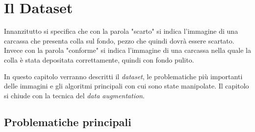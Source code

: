 
\chapter{Il Dataset}

Innanzitutto si specifica che con la parola "scarto" si indica l'immagine di una carcassa che presenta colla sul fondo, pezzo che quindi dovrà essere scartato.
Invece con la parola "conforme" si indica l'immagine di una carcassa nella quale la colla è stata depositata correttamente, quindi con fondo pulito.

In questo capitolo verranno descritti il \textit{dataset}, le problematiche più importanti delle immagini e gli algoritmi principali con cui sono state manipolate.
Il capitolo si chiude con la tecnica del \textit{data augmentation}.

\section{Problematiche principali}

